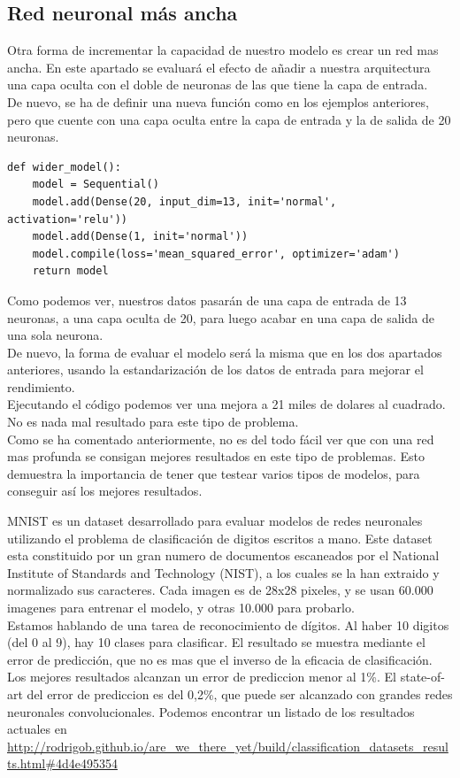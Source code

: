 \subsection{Red neuronal más ancha}
Otra forma de incrementar la capacidad de nuestro modelo es crear un red mas ancha. En este apartado se evaluará el efecto de añadir a nuestra arquitectura una capa oculta con el doble de neuronas de las que tiene la capa de entrada.\\
De nuevo, se ha de definir una nueva función como en los ejemplos anteriores, pero que cuente con una capa oculta entre la capa de entrada y la de salida de 20 neuronas.
\begin{verbatim}
def wider_model():
	model = Sequential()
	model.add(Dense(20, input_dim=13, init='normal', activation='relu'))
	model.add(Dense(1, init='normal'))
	model.compile(loss='mean_squared_error', optimizer='adam')
	return model
\end{verbatim}
Como podemos ver, nuestros datos pasarán de una capa de entrada de 13 neuronas, a una capa oculta de 20, para luego acabar en una capa de salida de una sola neurona.\\
De nuevo, la forma de evaluar el modelo será la misma que en los dos apartados anteriores, usando la estandarización de los datos de entrada para mejorar el rendimiento.\\
Ejecutando el código podemos ver una mejora a 21 miles de dolares al cuadrado. No es nada mal resultado para este tipo de problema.\\
Como se ha comentado anteriormente, no es del todo fácil ver que con una red mas profunda se consigan mejores resultados en este tipo de problemas. Esto demuestra la importancia de tener que testear varios tipos de modelos, para conseguir así los mejores resultados.

MNIST es un dataset desarrollado para evaluar modelos de redes neuronales utilizando el problema de clasificación de digitos escritos a mano. Este dataset esta constituido por un gran numero de documentos escaneados por el National Institute of Standards and Technology (NIST), a los cuales se la han extraido y normalizado sus caracteres. Cada imagen es de 28x28 pixeles, y se usan 60.000 imagenes para entrenar el modelo, y otras 10.000 para probarlo.\\
Estamos hablando de una tarea de reconocimiento de dígitos. Al haber 10 digitos (del 0 al 9), hay 10 clases para clasificar. El resultado se muestra mediante el error de predicción, que no es mas que el inverso de la eficacia de clasificación.\\
Los mejores resultados alcanzan un error de prediccion menor al 1\%. El state-of-art del error de prediccion es del 0,2\%, que puede ser alcanzado con grandes redes neuronales convolucionales. Podemos encontrar un listado de los resultados actuales en \url{http://rodrigob.github.io/are_we_there_yet/build/classification_datasets_results.html#4d4e495354}\\
